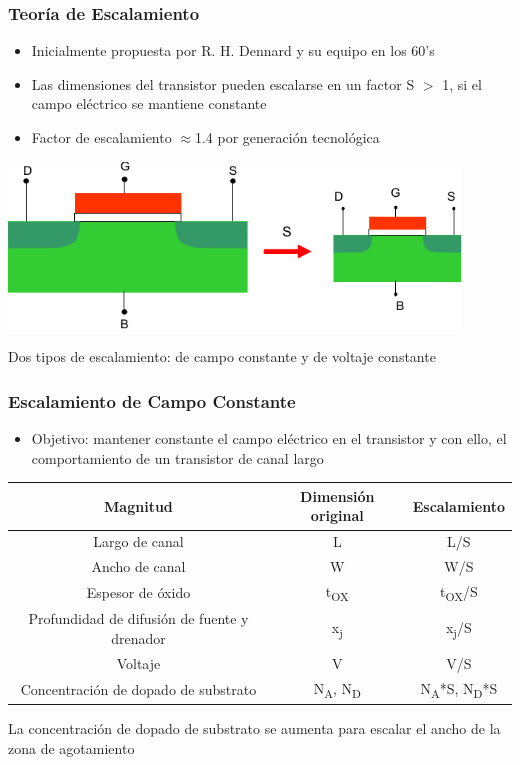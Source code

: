 \documentclass[t,aspectratio=169,10pt]{beamer}
\begin{document}
\begin{frame}
\frametitle{Teoría de Escalamiento}
\begin{itemize}
	\item Inicialmente propuesta por R. H. Dennard y su equipo en los 60's
	\item Las dimensiones del transistor pueden escalarse en un factor S $>$ 1, si el campo eléctrico se mantiene constante
	\item Factor de escalamiento $\approx$1.4 por generación tecnológica
\end{itemize}

\centering
\includegraphics[width=12cm]{scaling3}

Dos tipos de escalamiento: de campo constante y de voltaje constante
\end{frame}


\begin{frame}
\frametitle{Escalamiento de Campo Constante}
\begin{itemize}
	\item Objetivo: mantener constante el campo eléctrico en el transistor y con ello, el comportamiento de un transistor de canal largo
\end{itemize}

\centering
\begin{tabular}{|c|c|c|}
	\hline \textbf{Magnitud} & \textbf{Dimensión original} & \textbf{Escalamiento} \\
	\hline Largo de canal & L & L/S \\
	\hline Ancho de canal & W & W/S \\
	\hline Espesor de óxido & t\textsubscript{OX} & t\textsubscript{OX}/S \\
	\hline Profundidad de difusión de fuente y drenador & x\textsubscript{j} & x\textsubscript{j}/S \\
	\hline Voltaje & V & V/S  \\
	\hline Concentración de dopado de substrato & N\textsubscript{A}, N\textsubscript{D} & N\textsubscript{A}*S, N\textsubscript{D}*S \\
	\hline 
\end{tabular}

\vspace{5mm}
\centering
La concentración de dopado de substrato se aumenta para escalar el ancho de la zona de agotamiento
\end{frame}
\end{document}
